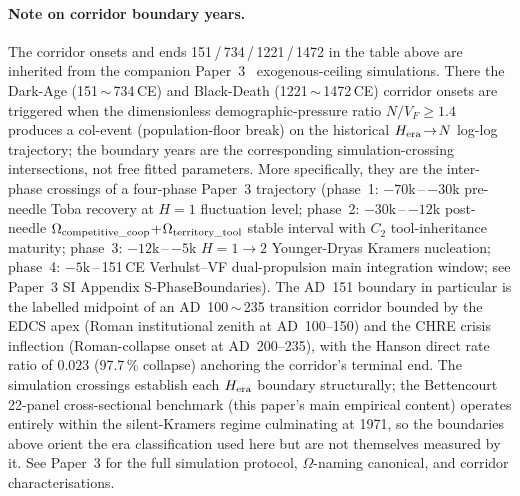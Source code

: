 \paragraph{Note on corridor boundary years.} The corridor onsets and ends 151\,/\,734\,/\,1221\,/\,1472 in the table above are inherited from the companion Paper~3~\cite{Kato2026c} exogenous-ceiling simulations. There the Dark-Age (151\,$\sim$\,734\,CE) and Black-Death (1221\,$\sim$\,1472\,CE) corridor onsets are triggered when the dimensionless demographic-pressure ratio $N/V_F\geq 1.4$ produces a col-event (population-floor break) on the historical $H_{\rm era}\!\to\!N$ log-log trajectory; the boundary years are the corresponding simulation-crossing intersections, not free fitted parameters. More specifically, they are the inter-phase crossings of a four-phase Paper~3 trajectory (phase~1: $-70$k\,--\,$-30$k pre-needle Toba recovery at $H{=}1$ fluctuation level; phase~2: $-30$k\,--\,$-12$k post-needle $\Omega_{\rm competitive\_coop}\!+\!\Omega_{\rm territory\_tool}$ stable interval with $C_2$ tool-inheritance maturity; phase~3: $-12$k\,--\,$-5$k $H{=}1\!\to\!2$ Younger-Dryas Kramers nucleation; phase~4: $-5$k\,--\,151\,CE Verhulst--VF dual-propulsion main integration window; see Paper~3 SI Appendix S-Phase\linebreak Boundaries). The AD~151 boundary in particular is the labelled midpoint of an AD~100\,$\sim$\,235 transition corridor bounded by the EDCS apex (Roman institutional zenith at AD~100--150) and the CHRE crisis inflection (Roman-collapse onset at AD~200--235), with the Hanson direct rate ratio of $0.023$ (97.7\,\% collapse) anchoring the corridor's terminal end. The simulation crossings establish each $H_{\rm era}$ boundary structurally; the Bettencourt 22-panel cross-sectional benchmark (this paper's main empirical content) operates entirely within the silent-Kramers regime culminating at 1971, so the boundaries above orient the era classification used here but are not themselves measured by it. See Paper~3 for the full simulation protocol, $\Omega$-naming canonical, and corridor characterisations.


